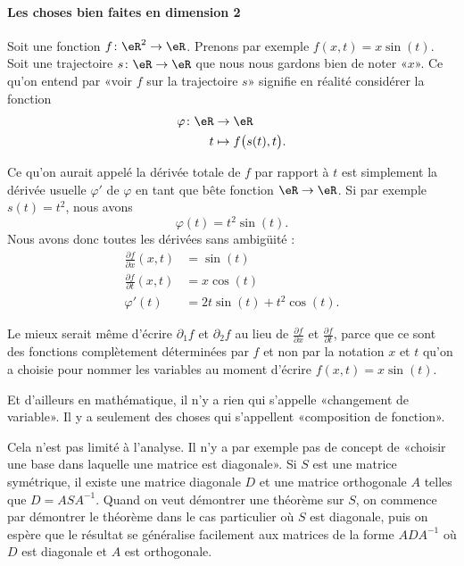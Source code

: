 \paragraph{Les choses bien faites en dimension 2}

Soit une fonction \( f\colon \eR^2\to \eR\). Prenons par exemple \( f(x,t)=x\sin(t)\). Soit une trajectoire \( s\colon \eR\to \eR\) que nous nous gardons bien de noter «\( x\)». Ce qu'on entend par «voir \( f\) sur la trajectoire \( s\)»  signifie en réalité considérer la fonction
\begin{equation}
    \begin{aligned}
        \varphi\colon \eR&\to \eR \\
        t&\mapsto f\big( s(t), t \big). 
    \end{aligned}
\end{equation}

Ce qu'on aurait appelé la dérivée totale de \( f\) par rapport à \( t\) est simplement la dérivée usuelle \( \varphi'\) de \( \varphi\) en tant que bête fonction \( \eR\to \eR\). Si par exemple \( s(t)=t^2\), nous avons
\begin{equation}
    \varphi(t)=t^2\sin(t).
\end{equation}
Nous avons donc toutes les dérivées sans ambigüité :
\begin{subequations}
    \begin{align}
        \frac{ \partial f }{ \partial x }(x,t)&=\sin(t)\\
        \frac{ \partial f }{ \partial t }(x,t)&=x\cos(t)\\
        \varphi'(t)&=2t\sin(t)+t^2\cos(t).
    \end{align}
\end{subequations}

Le mieux serait même d'écrire \( \partial_1f\) et \( \partial_2f\) au lieu de \( \frac{ \partial f }{ \partial x }\) et \( \frac{ \partial f }{ \partial t }\), parce que ce sont des fonctions complètement déterminées par \( f\) et non par la notation \( x\) et \( t\) qu'on a choisie pour nommer les variables au moment d'écrire \( f(x,t)=x\sin(t)\).

\begin{normaltext}
    Et d'ailleurs en mathématique, il n'y a rien qui s'appelle «changement de variable». Il y a seulement des choses qui s'appellent «composition de fonction».

    Cela n'est pas limité à l'analyse. Il n'y a par exemple pas de concept de «choisir une base dans laquelle une matrice est diagonale». Si \(S\) est une matrice symétrique, il existe une matrice diagonale \( D\) et une matrice orthogonale \( A \) telles que \( D=ASA^{-1}\). Quand on veut démontrer une théorème sur \( S\), on commence par démontrer le théorème dans le cas particulier où \( S\) est diagonale, puis on espère que le résultat se généralise facilement aux matrices de la forme \( ADA^{-1}\) où \( D\) est diagonale et \( A\) est orthogonale.
\end{normaltext}

